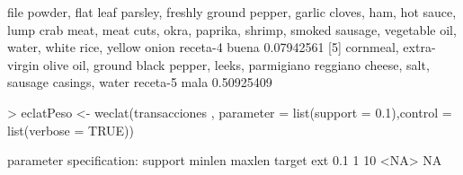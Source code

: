 \documentclass [a4paper] {article}
\begin{document}
\begin{Schunk}
\begin{Soutput}
{     file powder,                                                          
     flat leaf parsley,                                                    
     freshly ground pepper,                                                
     garlic cloves,                                                        
     ham,                                                                  
     hot sauce,                                                            
     lump crab meat,                                                       
     meat cuts,                                                            
     okra,                                                                 
     paprika,                                                              
     shrimp,                                                               
     smoked sausage,                                                       
     vegetable oil,                                                        
     water,                                                                
     white rice,                                                           
     yellow onion}                         receta-4 buena        0.07942561
[5] {cornmeal,                                                             
     extra-virgin olive oil,                                               
     ground black pepper,                                                  
     leeks,                                                                
     parmigiano reggiano cheese,                                           
     salt,                                                                 
     sausage casings,                                                      
     water}                                receta-5 mala         0.50925409
\end{Soutput}
\begin{Sinput}
> eclatPeso <- weclat(transacciones , parameter = list(support = 0.1),control = list(verbose = TRUE))
\end{Sinput}
\begin{Soutput}
parameter specification:
 support minlen maxlen target ext
     0.1      1     10   <NA>  NA


\end{Soutput}
\end{Schunk}
\end{document}
